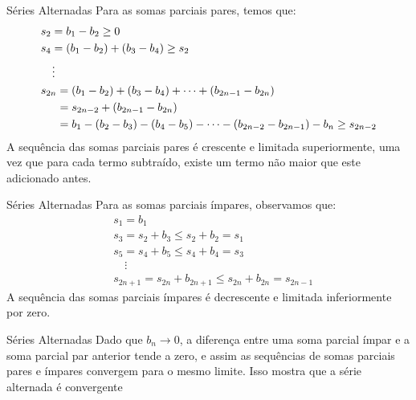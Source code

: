 \documentclass[brazil]{beamer}
\begin{document}
	\begin{frame}{Séries Alternadas}
		Para as somas parciais pares, temos que:
		\begin{align*}
			& s_{2} = b_1 - b_2 \geq 0                                                                                    \\
			& s_{4} = (b_1 - b_2) + (b_3 - b_4) \geq s_2                                                                  \\
			& \quad \vdots                                                                                                \\
			& s_{2n} = (b_1 - b_2) + (b_3 - b_4) + \cdots + (b_{2n-1} - b_{2n})                                           \\
			& \text{\hspace{0.5cm}}= s_{2n-2} + (b_{2n-1} - b_{2n})                                                       \\
			& \text{\hspace{0.5cm}}= b_1 - (b_2 - b_3) - (b_4 - b_5) - \cdots - (b_{2n-2} - b_{2n-1}) - b_n \geq s_{2n-2}
		\end{align*}
		A sequência das somas parciais pares é crescente e limitada superiormente, uma vez que para cada termo subtraído, existe um termo não maior que este adicionado antes.
	\end{frame}
	
	\begin{frame}{Séries Alternadas}
		Para as somas parciais ímpares, observamos que:
		\begin{align*}
			& s_{1} = b_1                                                  \\
			& s_{3} = s_{2} + b_3 \leq s_{2} + b_2 = s_{1}                 \\
			& s_{5} = s_{4} + b_5 \leq s_{4} + b_4 = s_{3}                 \\
			& \quad \vdots                                                 \\
			& s_{2n+1} = s_{2n} + b_{2n+1} \leq s_{2n} + b_{2n} = s_{2n-1}
		\end{align*}
		A sequência das somas parciais ímpares é decrescente e limitada inferiormente por zero.
		
	\end{frame}
	
	\begin{frame}{Séries Alternadas}
		Dado que $b_n \to 0$, a diferença entre uma soma parcial ímpar e a soma parcial par anterior tende a zero, e assim as sequências de somas parciais pares e ímpares convergem para o mesmo limite. Isso mostra que a série alternada é convergente
	\end{frame}
	
\end{document}
